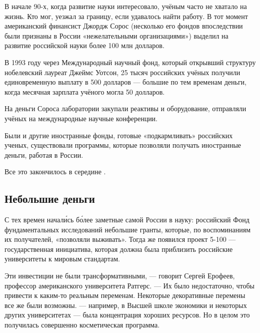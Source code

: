 В начале 90-х, когда развитие науки  интересовало, учёным часто не хватало на жизнь. Кто мог, уезжал за границу, если удавалось найти работу. В тот момент американский финансист Джордж Сорос (несколько его фондов впоследствии были признаны в России «нежелательными организациями») выделил на развитие российской науки более 100 млн долларов.

В 1993 году через Международный научный фонд, который  открывший структуру  нобелевский лауреат Джеймс Уотсон, 25 тысяч российских учёных получили единовременную выплату в 500 долларов --- большие по тем временам деньги, когда месячная зарплата учёного могла  50 долларов.

На деньги Сороса лаборатории закупали реактивы и оборудование, отправляли учёных на международные научные конференции.

Были и другие иностранные фонды, готовые «подкармливать» российских ученых, существовали программы, которые позволяли получать иностранные деньги, работая в России.

Все это закончилось в середине .

\subsection{Небольшие деньги}
С тех времен начал\'{и}сь б\'{о}лее заметные  самой России в науку: российский Фонд фундаментальных исследований
небольшие гранты, которые, по воспоминаниям их получателей, «позволяли выживать». Тогда же появился проект 5-100 --- государственная инициатива, которая должна была приблизить российские университеты к мировым стандартам.



\begin{fancyquotes}
    Эти инвестиции не были трансформативными, --- говорит Сергей Ерофеев, профессор американского университета Ратгерс. --- Их было недостаточно, чтобы привести к каким-то реальным переменам. Некоторые декоративные перемены все же были возможны.  --- например, в Высшей школе экономики и некоторых других университетах --- была концентрация хороших ресурсов. Но в целом это получилась совершенно косметическая программа.
\end{fancyquotes}


